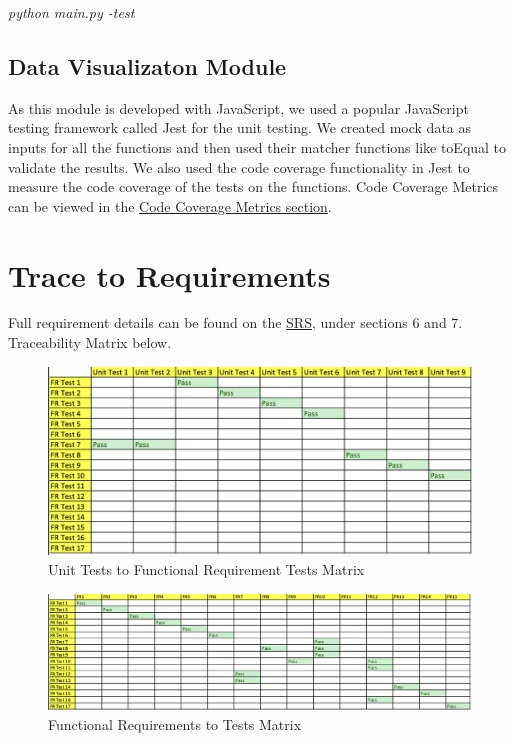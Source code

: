 \documentclass[12pt, titlepage]{article}
\begin{document}
\textit{python main.py -test}

\subsection{Data Visualizaton Module}
As this module is developed with JavaScript, we used a popular JavaScript testing framework called Jest for the unit testing. We created mock data as inputs for all the functions and then used their matcher functions like toEqual to validate the results. We also used the code coverage functionality in Jest to measure the code coverage of the tests on the functions. Code Coverage Metrics can be viewed in the \hyperref[Code Coverage Data Visualization]{Code Coverage Metrics section}.

\section{Trace to Requirements}
Full requirement details can be found on the \href{https://github.com/Dorps/aiboardgame/blob/main/docs/SRS/SRS.pdf}{SRS}, under sections 6 and 7. Traceability Matrix below.
\begin{figure}[!h]
    \centering
    \includegraphics[width=\textwidth]{Unit.png}
    \caption{Unit Tests to Functional Requirement Tests Matrix}
    \label{Functional Requirements to Tests Matrix}
\end{figure}
\begin{figure}[!h]
    \centering
    \includegraphics[width=\textwidth]{FR.png}
    \caption{Functional Requirements to Tests Matrix}
    \label{Functional Requirements to Tests Matrix}
\end{figure}
\end{document}
